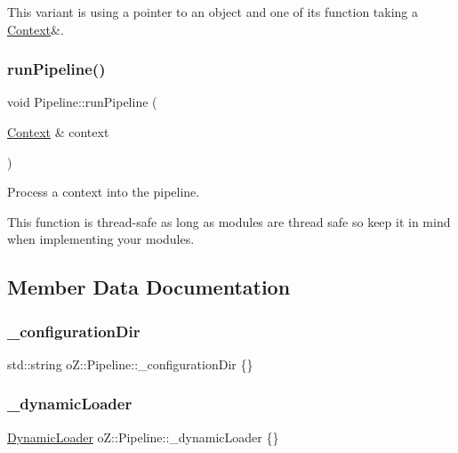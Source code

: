 This variant is using a pointer to an object and one of its function taking a \mbox{\hyperlink{classo_z_1_1_context}{Context}}\&. \mbox{\label{classo_z_1_1_pipeline_a90bddc5511acce66f2aa780c3bba29b4}} 
\subsubsection{\texorpdfstring{runPipeline()}{runPipeline()}}
{\footnotesize\ttfamily void Pipeline\+::run\+Pipeline (\begin{DoxyParamCaption}\item[{\mbox{\hyperlink{classo_z_1_1_context}{Context}} \&}]{context }\end{DoxyParamCaption})}



Process a context into the pipeline. 

This function is thread-\/safe as long as modules are thread safe so keep it in mind when implementing your modules. 

\subsection{Member Data Documentation}
\mbox{\label{classo_z_1_1_pipeline_af10d280dfd529f443a081b6d6498c5b9}} 
\subsubsection{\texorpdfstring{\_configurationDir}{\_configurationDir}}
{\footnotesize\ttfamily std\+::string o\+Z\+::\+Pipeline\+::\+\_\+configuration\+Dir \{\}\hspace{0.3cm}{\ttfamily [protected]}}

\mbox{\label{classo_z_1_1_pipeline_a6412859211177d78f0eebcecda79e841}} 
\subsubsection{\texorpdfstring{\_dynamicLoader}{\_dynamicLoader}}
{\footnotesize\ttfamily \mbox{\hyperlink{classo_z_1_1_dynamic_loader}{Dynamic\+Loader}} o\+Z\+::\+Pipeline\+::\+\_\+dynamic\+Loader \{\}\hspace{0.3cm}{\ttfamily [protected]}}

